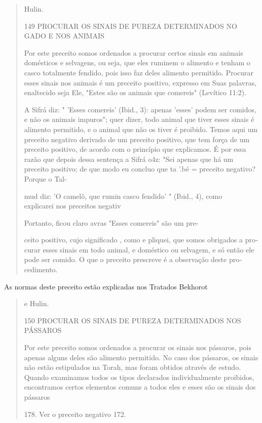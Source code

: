 \begin{quote}
Hulin.

149 PROCURAR OS SINAIS DE PUREZA DETERMINADOS NO GADO E NOS ANIMAIS

Por este preceito somos ordenados a procurar certos sinais em ani­mais
domésticos e selvagens, ou seja, que eles ruminem o alimento e tenham o
casco totalmente fendido, pois isso faz deles alimento permitido.
Procurar esses sinais nos animais é um preceito positivo, expresso em
Suas palavras, enal­tecido seja Ele, "Estes são os animais que comereis"
(Levítico 11:2).

A Sifrá diz: " 'Esses comereis' (Ibid., 3): apenas 'esses' podem ser
co­midos, e não os animais impuros"; quer dizer, todo animal que tiver
esses si­nais é alimento permitido, e o animal que não os tiver é
proibido. Temos aqui um preceito negativo derivado de um preceito
positivo, que tem força de um preceito positivo, de acordo com o
princípio que explicamos. É por essa razão que depois dessa sentença a
Sifrá o4z: "Sei apenas que há um preceito positivo; de que modo eu
concluo que ta '.bé = preceito negativo? Porque o Tal-

mud diz: 'O camelô, que rumin casco fendido' " (Ibid., 4), como\\
explicarei nos preceitos negativ

Portanto, ficou claro avras "Esses comereis" são um pre-

ceito positivo, cujo significado , como e pliquei, que somos obrigados a
pro­curar esses sinais em todo animal, e doméstico ou selvagem, e só
então ele pode ser comido. O que o preceito prescreve é a observação
deste pro­cedimento.
\end{quote}

As normas deste preceito estão explicadas nos Tratados Bekhorot

\begin{quote}
e Hulin.

150 PROCURAR OS SINAIS DE PUREZA DETERMINADOS NOS PÁSSAROS

Por este preceito somos ordenados a procurar os sinais nos pássa­ros,
pois apenas alguns deles são alimento permitido. No caso dos pássaros,
os sinais não estão estipulados na Torah, mas foram obtidos através de
estudo. Quan­do examinamos todos os tipos declarados individualmente
proibidos, encon­tramos certos elementos comuns a todos eles e esses são
os sinais dos pássaros

178. Ver o preceito negativo 172.
\end{quote}

